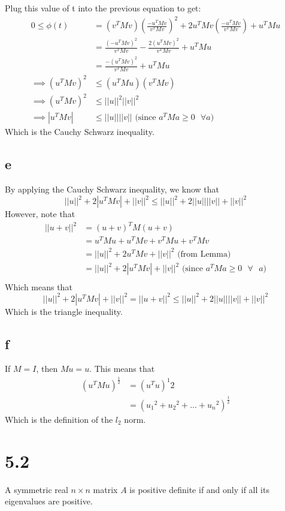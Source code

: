 \documentclass[11pt]{amsart}
\begin{document}
Plug this value of t into the previous equation to get:
\begin{align*}
0 \le \phi (t) &= (v^TMv)(\frac{-u^TMv}{v^TMv})^2 + 2u^TMv(\frac{-u^TMv}{v^TMv}) + u^TMu\\
&= \frac{(-u^TMv)^2}{v^TMv} - \frac{2(u^TMv)^2}{v^TMv} + u^TMu\\
&= \frac{-(u^TMv)^2}{v^TMv} + u^TMu\\
\implies (u^TMv)^2 &\le (u^TMu)(v^TMv)\\
\implies (u^TMv)^2 &\le ||u||^2||v||^2\\
\implies |u^TMv| &\le ||u||||v|| \text{ (since $a^TMa \ge 0$ $\forall a$)}
\end{align*}
Which is the Cauchy Schwarz inequality.

\subsection*{e}
By applying the Cauchy Schwarz inequality, we know that
\[
||u||^2 + 2|u^TMv| + ||v||^2 \le ||u||^2 + 2||u||||v||+ ||v||^2
\]
However, note that
\begin{align*}
||u+v||^2 &= (u+v)^TM(u+v)\\
&= u^TMu + u^TMv + v^TMu + v^TMv\\
&= ||u||^2 + 2u^TMv + ||v||^2 \text{ (from Lemma)}\\
&= ||u||^2 + 2|u^TMv| + ||v||^2 \text{ (since $a^TMa \ge 0$ $\forall$ $a$)}\\
\end{align*}
Which means that 
\[
 ||u||^2 + 2|u^TMv| + ||v||^2 = ||u + v||^2 \le ||u||^2 + 2||u||||v||+ ||v||^2
\]
Which is the triangle inequality.

\subsection*{f}
If $M=I$, then $Mu = u$. This means that
\begin{align*}
(u^TMu)^\frac{1}{2} &= (u^Tu)^{1}{2}\\
&= ({u_1}^2 + {u_2}^2 + ... + {u_n}^2)^\frac{1}{2}
\end{align*}
Which is the definition of the $l_2$ norm.

\section*{5.2}
A symmetric real $n \times n$ matrix $A$ is positive definite if and only if all its eigenvalues are positive.
\end{document}
